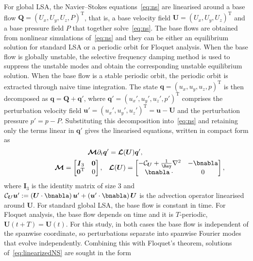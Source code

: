 \documentclass[lineno]{jfm}
\begin{document}
For global \ac{LSA}, the Navier--Stokes equations~\eqref{eq:ns} are linearised around a base flow $\boldsymbol{Q}={(U_x,U_y,U_z,P)}^\mathrm{T}$, that is, a base velocity field $\boldsymbol{U}={(U_x,U_y,U_z)}^\mathrm{T}$ and a base pressure field $P$ that together solve~\eqref{eq:ns}. The base flows are obtained from nonlinear simulations of~\eqref{eq:ns} and they can be either an equilibrium solution for standard \ac{LSA} or a periodic orbit for Floquet analysis. When the base flow is globally unstable, the selective frequency damping method \citep{akervik2006,sfd} is used to suppress the unstable modes and obtain the corresponding unstable equilibrium solution. When the base flow is a stable periodic orbit, the periodic orbit is extracted through naive time integration. The state $\boldsymbol{q}={(u_x,u_y,u_z,p)}^\mathrm{T}$ is then decomposed as $\boldsymbol{q}=\boldsymbol{Q}+\boldsymbol{q}'$, where $\boldsymbol{q}'={(u_x',u_y',u_z',p')}^\mathrm{T}$ comprises the perturbation velocity field $\boldsymbol{u}'={(u_x',u_y',u_z')}^\mathrm{T}=\boldsymbol{u}-\boldsymbol{U}$ and the perturbation pressure $p'=p-P$. Substituting this decomposition into~\eqref{eq:ns} and retaining only the terms linear in $\boldsymbol{q}'$ gives the linearised equations, written in compact form as%
\begin{equation}\label{eq:linearizedNS}
	\begin{aligned}
		\boldsymbol{\mathcal{M}}\partial_t\boldsymbol{q}'      & = \boldsymbol{\mathcal{L}}(\boldsymbol{U})\boldsymbol{q}',                                                                                                                                                   \\
		\qquad\qquad\boldsymbol{\mathcal{M}} = \begin{bmatrix}
			\boldsymbol{I}_3 & \boldsymbol{0} \\ \boldsymbol{0}^\mathrm{T} & 0 \end{bmatrix},\quad & \boldsymbol{\mathcal{L}}(\boldsymbol{U}) = \begin{bmatrix}
			-\mathcal{C}_{\boldsymbol{U}} + \frac{1}{\Rey}\nabla^2 & -\bnabla \\ \bnabla\cdot{} & 0
		                                                                                                                                    \end{bmatrix},
	\end{aligned}
\end{equation}
where $\boldsymbol{I}_3$ is the identity matrix of size 3 and $\mathcal{C}_{\boldsymbol{U}}\boldsymbol{u}':=(\boldsymbol{U}\cdot\bnabla)\,\boldsymbol{u}'+(\boldsymbol{u}'\cdot\bnabla)\,\boldsymbol{U}$ is the advection operator linearised around $\boldsymbol{U}$. For standard global \ac{LSA}, the base flow is constant in time. For Floquet analysis, the base flow depends on time and it is $T$-periodic, $\boldsymbol{U}(t+T)=\boldsymbol{U}(t)$. For this study, in both cases the base flow is independent of the spanwise coordinate, so perturbations separate into spanwise Fourier modes that evolve independently. Combining this with Floquet's theorem, solutions of~\eqref{eq:linearizedNS} are sought in the form
\end{document}
